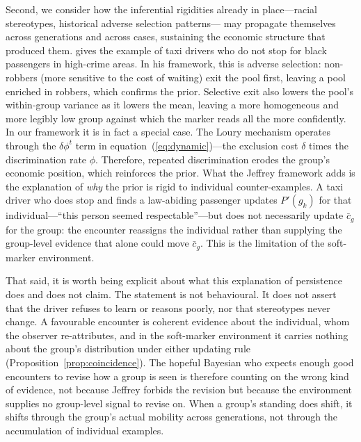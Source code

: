 \documentclass[pdflatex,sn-basic]{sn-jnl}
\theoremstyle{thmstyleone}
\numberwithin{proposition}{subsection}
\begin{document}
Second, we consider how the inferential
rigidities already in place---racial stereotypes, historical adverse
selection patterns--- may propagate themselves across generations and
across cases, sustaining the economic structure that produced them.
\citet{Loury2002} gives the example of taxi drivers who do not stop
for black passengers in high-crime areas. In his framework, this is
adverse selection: non-robbers (more sensitive to the cost of
waiting) exit the pool first, leaving a pool enriched in robbers,
which confirms the prior. Selective exit also lowers the pool's
within-group variance as it lowers the mean, leaving a more homogeneous
and more legibly low group against which the marker reads all the more
confidently. In our framework it is in fact a special case. The
Loury mechanism operates through the $\delta \phi^t$ term in
equation~(\ref{eq:dynamic})---the exclusion cost $\delta$ times the
discrimination rate $\phi$. Therefore, repeated discrimination erodes the
group's economic position, which reinforces the prior. What the
Jeffrey framework adds is the explanation of \emph{why} the prior is
rigid to individual counter-examples. A taxi driver who does stop
and finds a law-abiding passenger updates $P'(g_k)$ for that
individual---``this person seemed respectable''---but does not necessarily update
$\bar{c}_g$ for the group: the encounter reassigns the individual rather
than supplying the group-level evidence that alone could move
$\bar{c}_g$. This is the limitation of the soft-marker environment.

That said, it is worth being explicit about what this explanation of persistence does and does not claim. The statement is not behavioural. It does not assert that the driver refuses
to learn or reasons poorly, nor that stereotypes never change. A favourable
encounter is coherent evidence about the individual, whom the observer
re-attributes, and in the soft-marker environment it carries nothing about
the group's distribution under either updating rule
(Proposition~\ref{prop:coincidence}). The hopeful Bayesian who expects
enough good encounters to revise how a group is seen is therefore counting
on the wrong kind of evidence, not because Jeffrey forbids the revision but
because the environment supplies no group-level signal to revise on. When a
group's standing does shift, it shifts through the group's actual mobility
across generations, not through the accumulation of individual examples.
\end{document}
